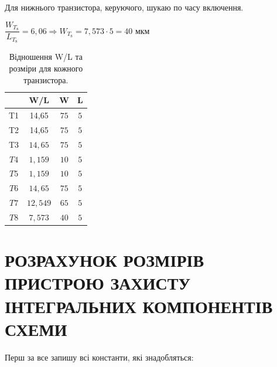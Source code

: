 \documentclass[a4paper,14pt]{extreport}
\begin{document}
  Для нижнього транзистора, керуючого, шукаю по часу включення.\\


  $ \dfrac{W_{T_{8}}}{L_{T_{8}}} =6,06 \Rightarrow {W_{T_{8}}} = 7,573 \cdot 5 = 40 $ мкм






  \begin{table}[h!]
  \begin{center}
  \caption{Відношення W/L та розміри для кожного транзистора.}
  \begin{tabular}{|c|c|c|c|}

  \hline             & W/L            & W           & L \\
  \hline   T1        & 14,65          & $75$        & $5$ \\
  \hline   T2        & 14,65          & $75$        & $5$ \\
  \hline   T3        & $14,65$        & $75$        & $5$ \\
  \hline   $T4$      & $1,159$        & $10$        & $5$ \\
  \hline   $T5$      & $1,159$        & $10$        & $5$ \\
  \hline   $T6$      & $14,65$        & $75$        & $5$ \\
  \hline   $T7$      & $12,549$       & $65$        & $5$ \\
  \hline   $T8$      & $7,573$        & $40$        & $5$ \\
  \hline
  \end{tabular}
  \end{center}
  \end{table}

\newpage
\chapter{РОЗРАХУНОК РОЗМІРІВ ПРИСТРОЮ ЗАХИСТУ ІНТЕГРАЛЬНИХ КОМПОНЕНТІВ СХЕМИ }
	Перш за все запишу всі константи, які знадобляться:\\
\end{document}
